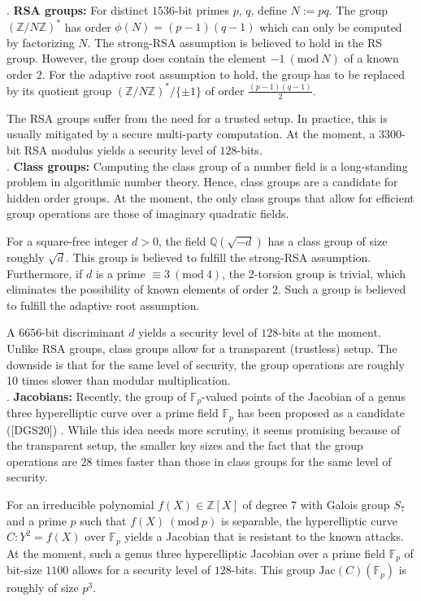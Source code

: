 \documentclass[11pt, lettersize, notitlepage, leqno, footskip=0.6cm]{article}
\newcommand{\bz}{\mathbb Z}
\newcommand{\bq}{\mathbb Q}
\newcommand{\bFp}{\mathbb{F}_p}
\newcommand{\mr}{\mathrm}
\newcommand{\Jac}{\mr{Jac}}
\newcommand{\Mod}[1]{\ (\mathrm{mod}\ #1)}
\numberwithin{equation}{section}
\begin{document}
. \textbf{RSA groups:} For distinct $1536$-bit primes $p$, $q$, define $N:= pq$. The group $(\bz/N\bz)^*$ has order $\phi(N) = (p-1)(q-1)$ which can only be computed by factorizing $N$. The strong-RSA assumption is believed to hold in the RS group. However, the group does contain the element $-1\Mod{N}$ of a known order $2$. For the adaptive root assumption to hold, the group has to be replaced by its quotient group $(\bz/N\bz)^*/\{\pm 1\}$ of order $\frac{(p-1)(q-1)}{2}.$ 

The RSA groups suffer from the need for a trusted setup. In practice, this is usually mitigated by a secure multi-party computation. At the moment, a $3300$-bit RSA modulus yields a security level of $128$-bits.\\


. \textbf{Class groups:} Computing the class group of a number field is a long-standing problem in algorithmic number theory. Hence, class groups are a candidate for hidden order groups. At the moment, the only class groups that allow for efficient group operations are those of imaginary quadratic fields.

For a square-free integer $d > 0$, the field $\bq(\sqrt{-d})$ has a class group of size roughly $\sqrt{d}$. This group is believed to fulfill the strong-RSA assumption. Furthermore, if $d$ is a prime $\equiv 3 \Mod{4}$, the $2$-torsion group is trivial, which eliminates the possibility of known elements of order $2$. Such a group is believed to fulfill the adaptive root assumption.

A $6656$-bit discriminant $d$ yields a security level of $128$-bits at the moment. Unlike RSA groups, class groups allow for a transparent (trustless) setup. The downside is that for the same level of security, the group operations are roughly 10 times slower than modular multiplication.\\

. \textbf{Jacobians:} Recently, the group of $\bFp$-valued points of the Jacobian of a genus three hyperelliptic curve over a prime field $\bFp$ has been proposed as a candidate ([DGS20]) . While this idea needs more scrutiny, it seems promising because of the transparent setup, the smaller key sizes and the fact that the group operations are 28 times faster than those in class groups for the same level of security.

For an irreducible polynomial $f(X)\in \bz[X]$ of degree $7$ with Galois group $S_7$ and a prime $p$ such that $f(X)\Mod{p}$ is separable, the hyperelliptic curve $C:Y^2 = f(X)$ over $\bFp$ yields a Jacobian that is resistant to the known attacks. At the moment, such a genus three hyperelliptic Jacobian over a prime field $\bFp$ of bit-size $1100$ allows for a security level of $128$-bits. This group $\Jac(C)(\bFp)$ is roughly of size $p^3$. 
\end{document}
